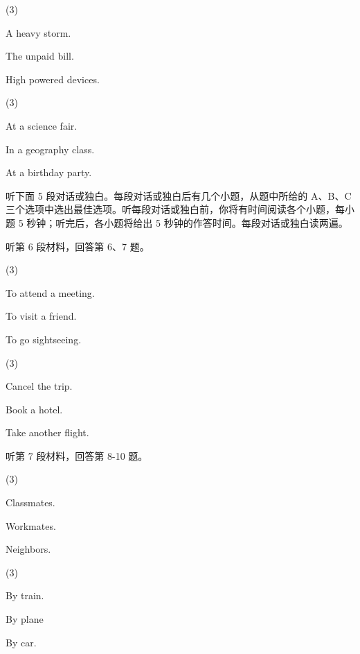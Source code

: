 \documentclass{英语试卷}
\begin{document}
\begin{choices}(3)
  \item A heavy storm.
  \item The unpaid bill.
  \item High powered devices.
\end{choices}
\begin{choices}(3)
  \item At a science fair.
  \item In a geography class.
  \item At a birthday party.
\end{choices}
\par 听下面 5 段对话或独白。每段对话或独白后有几个小题，从题中所给的 A、B、C 三个选项中选出最佳选项。听每段对话或独白前，你将有时间阅读各个小题，每小题 5 秒钟；听完后，各小题将给出 5 秒钟的作答时间。每段对话或独白读两遍。\par
\par 听第 6 段材料，回答第 6、7 题。\par
{}
\begin{choices}(3)
  \item To attend a meeting.
  \item To visit a friend.
  \item To go sightseeing.
\end{choices}
\begin{choices}(3)
  \item Cancel the trip.
  \item Book a hotel.
  \item Take another flight.
\end{choices}
\par 听第 7 段材料，回答第 8-10 题。\par
{}
\begin{choices}(3)
  \item Classmates.
  \item Workmates.
  \item Neighbors.
\end{choices}
\begin{choices}(3)
  \item By train.
  \item By plane
  \item By car.
\end{choices}
\end{document}
